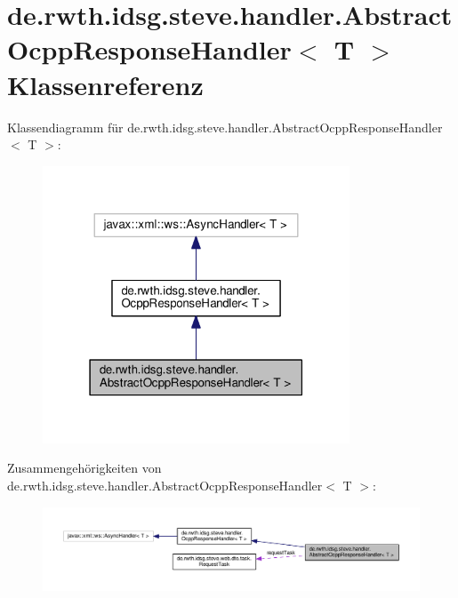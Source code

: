 \hypertarget{classde_1_1rwth_1_1idsg_1_1steve_1_1handler_1_1_abstract_ocpp_response_handler_3_01_t_01_4}{\section{de.\+rwth.\+idsg.\+steve.\+handler.\+Abstract\+Ocpp\+Response\+Handler$<$ T $>$ Klassenreferenz}
\label{classde_1_1rwth_1_1idsg_1_1steve_1_1handler_1_1_abstract_ocpp_response_handler_3_01_t_01_4}
}


Klassendiagramm für de.\+rwth.\+idsg.\+steve.\+handler.\+Abstract\+Ocpp\+Response\+Handler$<$ T $>$\+:\nopagebreak
\begin{figure}[H]
\begin{center}
\leavevmode
\includegraphics[width=259pt]{classde_1_1rwth_1_1idsg_1_1steve_1_1handler_1_1_abstract_ocpp_response_handler_3_01_t_01_4__inherit__graph}
\end{center}
\end{figure}


Zusammengehörigkeiten von de.\+rwth.\+idsg.\+steve.\+handler.\+Abstract\+Ocpp\+Response\+Handler$<$ T $>$\+:\nopagebreak
\begin{figure}[H]
\begin{center}
\leavevmode
\includegraphics[width=350pt]{classde_1_1rwth_1_1idsg_1_1steve_1_1handler_1_1_abstract_ocpp_response_handler_3_01_t_01_4__coll__graph}
\end{center}
\end{figure}
